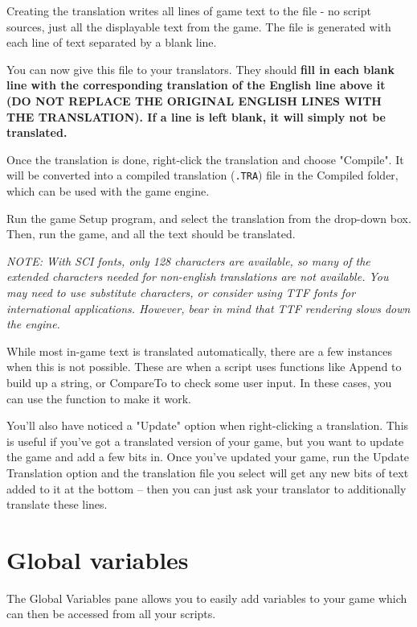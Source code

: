 Creating the translation writes all lines of game text to the file - no script
sources, just all the displayable text from the game. The file is generated with
each line of text separated by a blank line.

You can now give this file to your translators. They should \bf{fill in each blank line
with the corresponding translation of the English line above it (DO NOT REPLACE THE
ORIGINAL ENGLISH LINES WITH THE TRANSLATION)}. If a line is left blank, it will simply
not be translated.

Once the translation is done, right-click the translation and choose "Compile".
It will be converted into a compiled translation (\verb$.TRA$) file in the
Compiled folder, which can be used with the game engine.

Run the game Setup program, and select the translation from the drop-down box.
Then, run the game, and all the text should be translated.

\it{NOTE: With SCI fonts, only 128 characters are available, so many of the extended
characters needed for non-english translations are not available. You may need to use
substitute characters, or consider using TTF fonts for international applications. However,
bear in mind that TTF rendering slows down the engine.}

While most in-game text is translated automatically, there are a few instances when
this is not possible. These are when a script uses functions like Append to build
up a string, or CompareTo to check some user input. In these cases, you can use the
 function to make it work.

You'll also have noticed a "Update" option when right-clicking a translation. This is useful if you've
got a translated version of your game, but you want to update the game and add a few bits in.
Once you've updated your game, run the Update Translation option and the translation file
you select will get any new bits of text added to it at the bottom -- then you can just ask
your translator to additionally translate these lines.


\section{Global variables}\label{GlobalVariables}%

The Global Variables pane allows you to easily add variables to your game which
can then be accessed from all your scripts.

